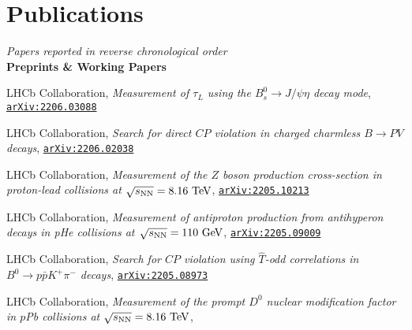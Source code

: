 \newcommand{\journal}[1]
  {\textbf{\large #1}\\\vspace{-5mm}}

\newcommand{\arxiv}[1]
  {\href{https://arxiv.org/abs/#1}{\texttt{arXiv:#1}}}


\section*{Publications}
\begin{cvcontent}
  \emph{Papers reported in reverse chronological order}\\[3mm]
  \journal{Preprints \& Working Papers}
  \begin{enumerate}[label={[\arabic*]}, leftmargin=1.5cm]
    \item LHCb Collaboration,
    \emph{Measurement of $\tau_{L}$ using the $B_{s}^{0} \to J/\psi \eta$ decay mode},
    \arxiv{2206.03088}
    \item LHCb Collaboration,
    \emph{Search for direct $CP$ violation in charged charmless $B \to PV$ decays},
    \arxiv{2206.02038}
    \item LHCb Collaboration,
    \emph{Measurement of the $Z$ boson production cross-section in proton-lead collisions at $\sqrt{s_{\rm{NN}}}=8.16~\rm{TeV}$},
    \arxiv{2205.10213}
    \item LHCb Collaboration,
    \emph{Measurement of antiproton production from antihyperon decays in pHe collisions at $\sqrt{s_{\rm{NN}}}=110~\rm{GeV}$},
    \arxiv{2205.09009}
    \item LHCb Collaboration,
    \emph{Search for $CP$ violation using $\hat{T}$-odd correlations in $B^{0} \to p \bar p K^{+} \pi^{-}$ decays},
    \arxiv{2205.08973}
    \item LHCb Collaboration,
    \emph{Measurement of the prompt $D^0$ nuclear modification factor in $p$Pb collisions at $\sqrt{s_{\rm{NN}}} = 8.16~{\rm{TeV}}$},

\end{enumerate}
\end{cvcontent}
